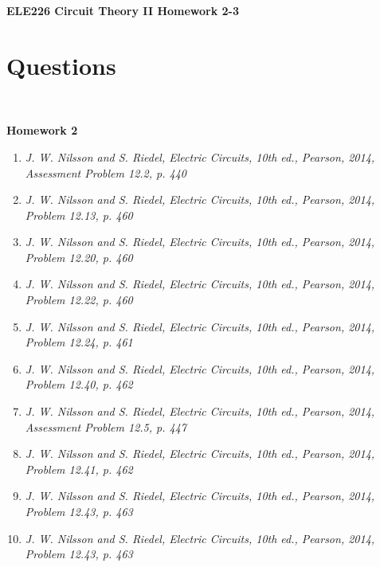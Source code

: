 \documentclass[11pt]{article}
\begin{document}
\begin{center}
\large
\textbf{ELE226 Circuit Theory II Homework 2-3}
\end{center}

\section{Questions}

\

\textbf{Homework 2}

\begin{enumerate}[leftmargin=*,label=\textbf{2.\arabic*.}]

\item \textit{J. W. Nilsson and S. Riedel, Electric Circuits, 10th ed., Pearson, 2014, Assessment Problem 12.2, p. 440}

\item \textit{J. W. Nilsson and S. Riedel, Electric Circuits, 10th ed., Pearson, 2014, Problem 12.13, p. 460}

\item \textit{J. W. Nilsson and S. Riedel, Electric Circuits, 10th ed., Pearson, 2014, Problem 12.20, p. 460}

\item \textit{J. W. Nilsson and S. Riedel, Electric Circuits, 10th ed., Pearson, 2014, Problem 12.22, p. 460}

\item \textit{J. W. Nilsson and S. Riedel, Electric Circuits, 10th ed., Pearson, 2014, Problem 12.24, p. 461}

\item \textit{J. W. Nilsson and S. Riedel, Electric Circuits, 10th ed., Pearson, 2014, Problem 12.40, p. 462}

\item \textit{J. W. Nilsson and S. Riedel, Electric Circuits, 10th ed., Pearson, 2014, Assessment Problem 12.5, p. 447}

\item \textit{J. W. Nilsson and S. Riedel, Electric Circuits, 10th ed., Pearson, 2014, Problem 12.41, p. 462}

\item \textit{J. W. Nilsson and S. Riedel, Electric Circuits, 10th ed., Pearson, 2014, Problem 12.43, p. 463}

\item \textit{J. W. Nilsson and S. Riedel, Electric Circuits, 10th ed., Pearson, 2014, Problem 12.43, p. 463}

\end{enumerate}
\end{document}
